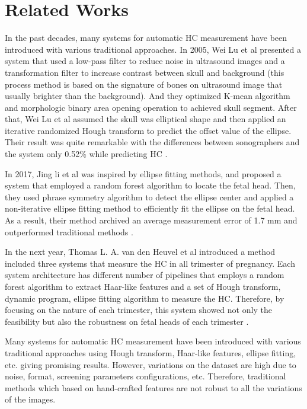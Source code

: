 \chapter{Related Works}
\noindent


%
	In the past decades, many systems for automatic HC measurement have been introduced with various traditional approaches. In 2005, Wei Lu et al presented a system that used a low-pass filter to reduce noise in ultrasound images and a transformation filter to increase contrast between skull and background (this process method is based on the signature of bones on ultrasound image that usually brighter than the background). And they optimized K-mean algorithm and morphologic binary area opening operation to achieved skull segment. After that, Wei Lu et al assumed the skull was elliptical shape and then applied an iterative randomized Hough transform to predict the offset value of the ellipse. Their result was quite remarkable with the differences between sonographers and the system only 0.52\% while predicting HC \cite{lu}.
	
	In 2017, Jing li et al was inspired by ellipse fitting methods, and proposed a system that employed a random forest algorithm to locate the fetal head. Then, they used phrase symmetry algorithm to detect the ellipse center and applied a non-iterative ellipse fitting method to efficiently fit the ellipse on the fetal head. As a result, their method archived an average measurement error of 1.7 mm and outperformed traditional methods \cite{li}.
	
	In the next year, Thomas L. A. van den Heuvel et al introduced a method included three systems that measure the HC in all trimester of pregnancy. Each system architecture has different number of pipelines that employs a random forest algorithm to extract Haar-like features and a set of Hough transform, dynamic program, ellipse fitting algorithm to measure the HC. Therefore, by focusing on the nature of each trimester, this system showed not only the feasibility but also the robustness on fetal heads of each trimester \cite{thomas}.
	
	Many systems for automatic HC measurement have been introduced with various traditional approaches using Hough transform, Haar-like features, ellipse fitting, etc. giving promising results. However, variations on the dataset are high due to noise, format, screening parameters configurations, etc. Therefore, traditional methods which based on hand-crafted features are not robust to all the variations of the images. 
	
